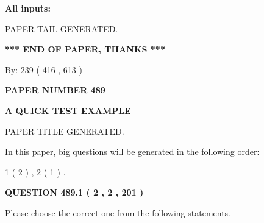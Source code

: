 \documentclass[12pt]{article}
\begin{document}
   
\noindent{}
   
   
   
   
\noindent\vspace{0.1in}\hspace{-0.08in} {\textbf{\Large{All inputs: }}}
   
   
   
   
   
   
 \vspace{0.2in}
 
   
   
\vspace{2.0in} PAPER TAIL GENERATED.
   
   
   
   
\vspace{1.0in} 
{\textbf{\large{ *** END OF PAPER, THANKS *** }}} 
   
   
\hspace{1.0in} By: 
 239 ( 416 ,  613 )
   
   
   
   
\newpage 
\setcounter{page}{ 
   489001 } 
   
   
   
   
 {\textbf{ \Large{ PAPER NUMBER  489  }}}
   
   
\vspace{0.2in}
   
   
   
   
   
   
   
   
 \vspace{0.2in}
{\LARGE {\textbf{ A QUICK TEST EXAMPLE}}}
   
   
 PAPER TITLE GENERATED.
   
   
   
\vspace{0.2in}
   
In this paper, big questions will be generated in the following order: 
   
   
   1 ( 2 )
 ,
   2 ( 1 )
 .
  
\vspace{0.2in}
  
{\textbf{\Large{QUESTION
489.1 
 ( 2 , 2 , 201 )
}}}
  
  
Please choose the correct one from the following statements.
 
\end{document}
